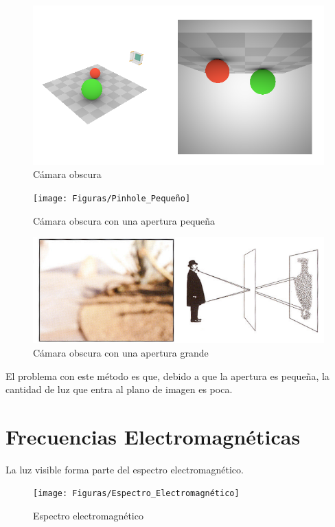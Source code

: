 \documentclass{article}
\begin{document}
\begin{figure}[H]
	\centering
	\includegraphics[width=0.65\linewidth]{Figuras/Pinhole}
	\caption{Cámara obscura}
	\label{fig:pinhole}
\end{figure}

\begin{figure}[H]
	\centering
	\texttt{[image: Figuras/Pinhole\_Pequeño]}
	\caption{Cámara obscura con una apertura pequeña}
	\label{fig:pinholepequeno}
\end{figure}

\begin{figure}[H]
	\centering
	\includegraphics[width=0.65\linewidth]{Figuras/Pinhole_Grande}
	\caption{Cámara obscura con una apertura grande}
	\label{fig:pinholegrande}
\end{figure}

El problema con este método es que, debido a que la apertura es pequeña, la cantidad de luz que entra al plano de imagen es poca.

\pagebreak

\section{Frecuencias Electromagnéticas}
	
	La luz visible forma parte del espectro electromagnético.
	
	\begin{figure}[H]
		\centering
		\texttt{[image: Figuras/Espectro\_Electromagnético]}
		\caption{Espectro electromagnético}
		\label{fig:espectroelectromagnetico}
	\end{figure}
\end{document}
